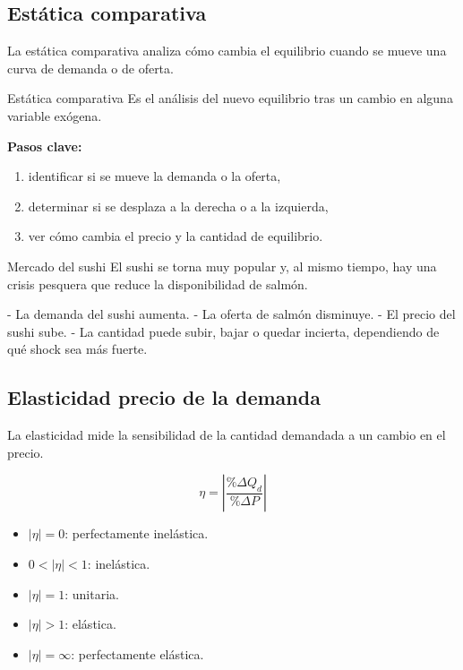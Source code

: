 \subsection{Estática comparativa}

La estática comparativa analiza cómo cambia el equilibrio cuando se mueve una curva de demanda o de oferta.

\begin{concepto}{Estática comparativa}
Es el análisis del nuevo equilibrio tras un cambio en alguna variable exógena.
\end{concepto}

\textbf{Pasos clave:}
\begin{enumerate}
    \item identificar si se mueve la demanda o la oferta,
    \item determinar si se desplaza a la derecha o a la izquierda,
    \item ver cómo cambia el precio y la cantidad de equilibrio.
\end{enumerate}

\begin{ejercicio}{Mercado del sushi}
El sushi se torna muy popular y, al mismo tiempo, hay una crisis pesquera que reduce la disponibilidad de salmón.

- La demanda del sushi aumenta.
- La oferta de salmón disminuye.
- El precio del sushi sube.
- La cantidad puede subir, bajar o quedar incierta, dependiendo de qué shock sea más fuerte.
\end{ejercicio}

\subsection{Elasticidad precio de la demanda}

La elasticidad mide la sensibilidad de la cantidad demandada a un cambio en el precio.

\begin{equation}
\eta = \left| \frac{\%\Delta Q_d}{\%\Delta P} \right|
\end{equation}

\begin{itemize}
    \item $|\eta| = 0$: perfectamente inelástica.
    \item $0 < |\eta| < 1$: inelástica.
    \item $|\eta| = 1$: unitaria.
    \item $|\eta| > 1$: elástica.
    \item $|\eta| = \infty$: perfectamente elástica.
\end{itemize}

